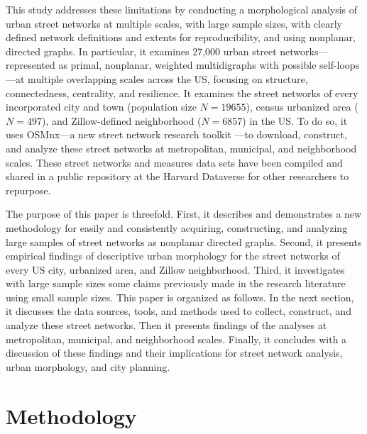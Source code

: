 \documentclass[11pt]{article}
\begin{document}
\begin{multicols}{2}
This study addresses these limitations by conducting a morphological analysis of urban street networks at multiple scales, with large sample sizes, with clearly defined network definitions and extents for reproducibility, and using nonplanar, directed graphs. In particular, it examines 27,000 urban street networks---represented as primal, nonplanar, weighted multidigraphs with possible self-loops---at multiple overlapping scales across the US, focusing on structure, connectedness, centrality, and resilience. It examines the street networks of every incorporated city and town (population size $N=19655$), census urbanized area ($N=497$), and Zillow-defined neighborhood ($N=6857$) in the US. To do so, it uses OSMnx---a new street network research toolkit \citep{boeing_osmnx:_2017}---to download, construct, and analyze these street networks at metropolitan, municipal, and neighborhood scales. These street networks and measures data sets have been compiled and shared in a public repository at the Harvard Dataverse for other researchers to repurpose.

The purpose of this paper is threefold. First, it describes and demonstrates a new methodology for easily and consistently acquiring, constructing, and analyzing large samples of street networks as nonplanar directed graphs. Second, it presents empirical findings of descriptive urban morphology for the street networks of every US city, urbanized area, and Zillow neighborhood. Third, it investigates with large sample sizes some claims previously made in the research literature using small sample sizes. This paper is organized as follows. In the next section, it discusses the data sources, tools, and methods used to collect, construct, and analyze these street networks. Then it presents findings of the analyses at metropolitan, municipal, and neighborhood scales. Finally, it concludes with a discussion of these findings and their implications for street network analysis, urban morphology, and city planning.



\section{Methodology}


\end{multicols}
\end{document}
